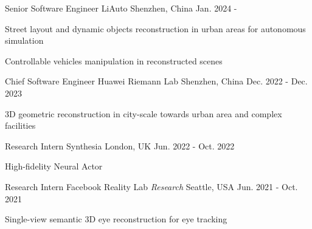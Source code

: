 


\begin{cventries}

\cventry
{Senior Software Engineer} %
{LiAuto} %
{Shenzhen, China} %
{Jan. 2024 -} %
{ %
\begin{cvitems}
\item {Street layout and dynamic objects reconstruction in urban areas for autonomous simulation}
\item {Controllable vehicles manipulation in reconstructed scenes}
\end{cvitems}
}

\cventry
{Chief Software Engineer} %
{Huawei Riemann Lab} %
{Shenzhen, China} %
{Dec. 2022 - Dec. 2023} %
{ %
\begin{cvitems}
\item {3D geometric reconstruction in city-scale towards urban area and complex facilities}
\end{cvitems}
}

\cventry
{Research Intern} %
{Synthesia} %
{London, UK} %
{Jun. 2022 - Oct. 2022} %
{ %
\begin{cvitems}
\item {High-fidelity Neural Actor}
\end{cvitems}
}

\cventry
{Research Intern} %
{Facebook Reality Lab \textit{Research}} %
{Seattle, USA} %
{Jun. 2021 - Oct. 2021} %
{ %
\begin{cvitems}
\item {Single-view semantic 3D eye reconstruction for eye tracking}
\end{cvitems}
}


\end{cventries}
